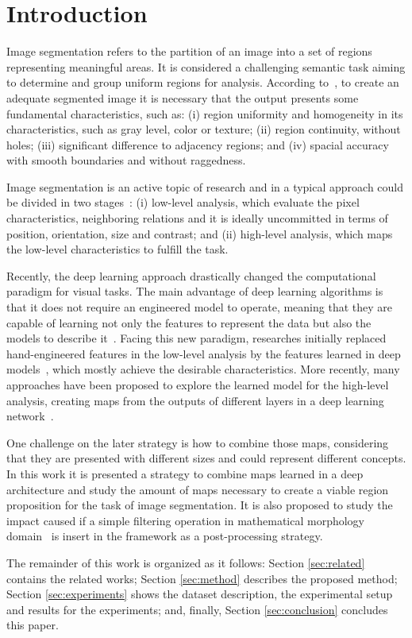 \section{Introduction}
\label{sec:intro}

Image segmentation refers to the partition of an image into a set of regions representing  meaningful areas. It is considered a challenging semantic task aiming to determine and group uniform regions for analysis. According to~\cite{DOMINGUEZ}, to create an adequate segmented image it is necessary that the output presents some fundamental characteristics, such as: (i) region uniformity and homogeneity in  its characteristics, such as gray level, color or texture; (ii) region continuity, without holes; (iii) significant difference to adjacency regions; and (iv) spacial accuracy with smooth boundaries and without raggedness. 

Image segmentation is an active topic of research and in a typical approach could be divided in two stages~\cite{guigues06}: (i) low-level analysis, which evaluate the pixel characteristics, neighboring relations and it is ideally uncommitted in terms of position, orientation,
size and contrast; and (ii) high-level analysis, which maps the low-level characteristics to fulfill the task.  

Recently, the deep learning approach drastically changed the computational paradigm for visual tasks. The main advantage of deep learning algorithms is that it does not require an engineered model to operate, meaning that they are capable of learning not only the features to represent the data but also the models to describe it~\cite{goodfellow16}. Facing this new paradigm, researches initially replaced  hand-engineered features in the low-level analysis by the features learned in deep models~\cite{farabet2013,simonyan2014,lee2015}, which mostly achieve the desirable characteristics. More recently, many approaches have been proposed to explore the learned model for the high-level analysis, creating maps from the outputs of different layers in a deep learning network~\cite{xie2017,cheng2016,maninis2017,liu2017}. 

One challenge on the later strategy is how to combine those maps, considering that they are presented with different sizes and could represent different concepts. In this work it is presented a strategy to combine maps learned in a deep architecture and study the amount of maps necessary to create a viable region proposition for the task of image segmentation. It is also proposed to study the impact caused if a simple filtering operation in mathematical morphology domain~\cite{najman13} is insert in the framework as a post-processing strategy.  

The remainder of this work is organized as it follows: Section \ref{sec:related} contains the related works; Section \ref{sec:method} describes the proposed method; Section \ref{sec:experiments} shows the dataset description, the experimental setup and results for the experiments; and, finally, Section \ref{sec:conclusion} concludes this paper.

